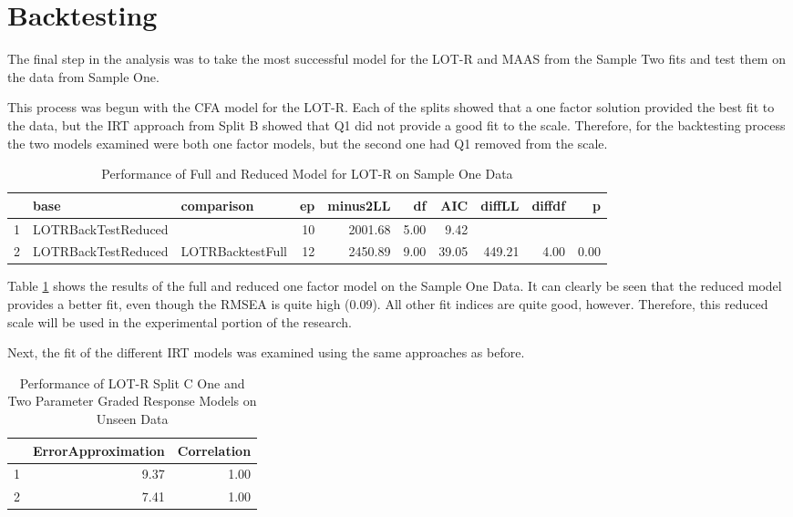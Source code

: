 \documentclass{article}
\begin{document}
\section{Backtesting}
\label{sec:backtesting}

The final step in the analysis was to take the most successful model for the LOT-R and MAAS from the Sample Two fits and test them on the data from Sample One. 

This process was begun with the CFA model for the LOT-R. Each of the splits showed that a one factor solution provided the best fit to the data, but the IRT approach from Split B showed that Q1 did not provide a good fit to the scale. Therefore, for the backtesting process the two models examined were both one factor models, but the second one had Q1 removed from the scale.



\begin{table}[ht]
\centering
\begin{tabular}{rllrrrrrrr}
  \hline
 & base & comparison & ep & minus2LL & df & AIC & diffLL & diffdf & p \\ 
  \hline
1 & LOTRBackTestReduced &  &  10 & 2001.68 & 5.00 & 9.42 &  &  &  \\ 
  2 & LOTRBackTestReduced & LOTRBacktestFull &  12 & 2450.89 & 9.00 & 39.05 & 449.21 & 4.00 & 0.00 \\ 
   \hline
\end{tabular}
\caption{Performance of Full and Reduced Model for LOT-R on Sample One Data} 
\label{tab:lotrbtsemcompare}
\end{table}
Table \ref{tab:lotrbtsemcompare} shows the results of the full and reduced one factor model on the Sample One Data. It can clearly be seen that the reduced model provides a better fit, even though the RMSEA is quite high (0.09). All other fit indices are quite good, however. Therefore, this reduced scale will be used in the experimental portion of the research. 

Next, the fit of the different IRT models was examined using the same approaches as before. 


\begin{table}[ht]
\centering
\begin{tabular}{rrr}
  \hline
 & ErrorApproximation & Correlation \\ 
  \hline
1 & 9.37 & 1.00 \\ 
  2 & 7.41 & 1.00 \\ 
   \hline
\end{tabular}
\caption{Performance of LOT-R Split C One and Two Parameter Graded Response Models on Unseen Data} 
\label{tab:lotrbtgrmtest}
\end{table}
\end{document}
